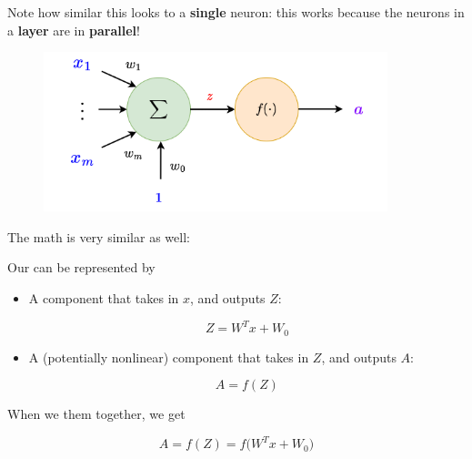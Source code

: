         Note how similar this looks to a \textbf{single} neuron: this works because the neurons in a \textbf{layer} are in \textbf{parallel}!
        
        \begin{figure}[H]
            \centering
            \includegraphics[width=100mm,scale=0.4]{images/nn_images/full_neuron.png}
        \end{figure}
        
        The math is very similar as well:\\
        
        \begin{definition}
            Our  can be represented by
            
            \begin{itemize}
                \item A  component that takes in $x$, and outputs  $Z$:
                
                \begin{equation*}
                    Z = W^T x + W_0
                \end{equation*}
                
                \item A (potentially nonlinear)  component that takes in $Z$, and outputs  $A$:
                
                \begin{equation*}
                    A = f(Z)
                \end{equation*}
                
            \end{itemize}
        
            When we  them together, we get
                
                \begin{equation*}
                    A = f(Z) = f \Big( W^Tx+W_0 \Big)
                \end{equation*}
        \end{definition}
        
